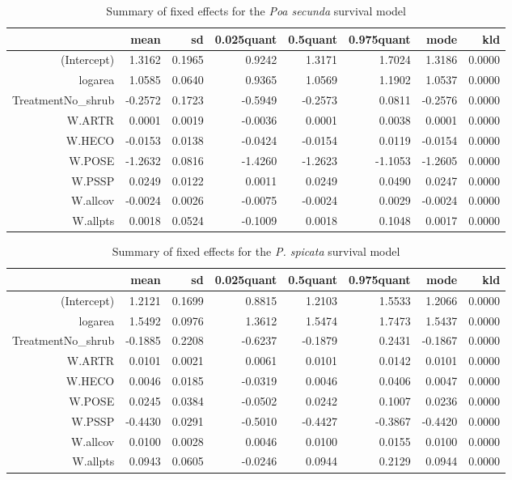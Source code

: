 \documentclass[11pt]{article}
\begin{document}
\begin{table}[ht]
\centering
\caption{Summary of fixed effects for the \textit{Poa secunda} survival model} 
\label{POSEsurvival}
\begin{tabular}{rrrrrrrr}
  \hline
 & mean & sd & 0.025quant & 0.5quant & 0.975quant & mode & kld \\ 
  \hline
(Intercept) & 1.3162 & 0.1965 & 0.9242 & 1.3171 & 1.7024 & 1.3186 & 0.0000 \\ 
  logarea & 1.0585 & 0.0640 & 0.9365 & 1.0569 & 1.1902 & 1.0537 & 0.0000 \\ 
  TreatmentNo\_shrub & -0.2572 & 0.1723 & -0.5949 & -0.2573 & 0.0811 & -0.2576 & 0.0000 \\ 
  W.ARTR & 0.0001 & 0.0019 & -0.0036 & 0.0001 & 0.0038 & 0.0001 & 0.0000 \\ 
  W.HECO & -0.0153 & 0.0138 & -0.0424 & -0.0154 & 0.0119 & -0.0154 & 0.0000 \\ 
  W.POSE & -1.2632 & 0.0816 & -1.4260 & -1.2623 & -1.1053 & -1.2605 & 0.0000 \\ 
  W.PSSP & 0.0249 & 0.0122 & 0.0011 & 0.0249 & 0.0490 & 0.0247 & 0.0000 \\ 
  W.allcov & -0.0024 & 0.0026 & -0.0075 & -0.0024 & 0.0029 & -0.0024 & 0.0000 \\ 
  W.allpts & 0.0018 & 0.0524 & -0.1009 & 0.0018 & 0.1048 & 0.0017 & 0.0000 \\ 
   \hline
\end{tabular}
\end{table}

\begin{table}[ht]
\centering
\caption{Summary of fixed effects for the \textit{P. spicata} survival model} 
\label{PSSPsurvival}
\begin{tabular}{rrrrrrrr}
  \hline
 & mean & sd & 0.025quant & 0.5quant & 0.975quant & mode & kld \\ 
  \hline
(Intercept) & 1.2121 & 0.1699 & 0.8815 & 1.2103 & 1.5533 & 1.2066 & 0.0000 \\ 
  logarea & 1.5492 & 0.0976 & 1.3612 & 1.5474 & 1.7473 & 1.5437 & 0.0000 \\ 
  TreatmentNo\_shrub & -0.1885 & 0.2208 & -0.6237 & -0.1879 & 0.2431 & -0.1867 & 0.0000 \\ 
  W.ARTR & 0.0101 & 0.0021 & 0.0061 & 0.0101 & 0.0142 & 0.0101 & 0.0000 \\ 
  W.HECO & 0.0046 & 0.0185 & -0.0319 & 0.0046 & 0.0406 & 0.0047 & 0.0000 \\ 
  W.POSE & 0.0245 & 0.0384 & -0.0502 & 0.0242 & 0.1007 & 0.0236 & 0.0000 \\ 
  W.PSSP & -0.4430 & 0.0291 & -0.5010 & -0.4427 & -0.3867 & -0.4420 & 0.0000 \\ 
  W.allcov & 0.0100 & 0.0028 & 0.0046 & 0.0100 & 0.0155 & 0.0100 & 0.0000 \\ 
  W.allpts & 0.0943 & 0.0605 & -0.0246 & 0.0944 & 0.2129 & 0.0944 & 0.0000 \\ 
   \hline
\end{tabular}
\end{table}
\end{document}
